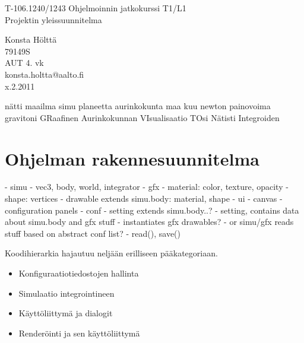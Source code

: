 \documentclass[a4paper,11pt]{article}
\begin{document}
\thispagestyle{empty}

\vspace*{5cm}

\begin{center}

{ \Huge T-106.1240/1243 Ohjelmoinnin jatkokurssi T1/L1 }
\\[1cm]
{ \huge Projektin yleissuunnitelma }
\end{center}

\vfill

\begin{flushright}

Konsta Hölttä\\
79149S\\
AUT 4. vk\\
konsta.holtta@aalto.fi\\
x.2.2011
\end{flushright}

\newcommand{\kuvaa}[4]{%
	\begin{figure}[h!]%
		\centering \texttt{[image: \#2]}%
		\caption{#3 \label{#4}}%
	\end{figure}%
}
\newcommand{\kuva}[2]{\kuvaa{0.6}{#1}{#2}{fig:#1}}

\newpage
nätti maailma simu planeetta aurinkokunta maa kuu newton painovoima
gravitoni
GRaafinen Aurinkokunnan VIsualisaatio TOsi Nätisti Integroiden

\section{Ohjelman rakennesuunnitelma}
- simu
	- vec3, body, world, integrator
- gfx
	- material: color, texture, opacity
	- shape: vertices
	- drawable extends simu.body: material, shape
- ui
	- canvas
	- configuration panels
- conf
	- setting extends simu.body..?
	- setting, contains data about simu.body and gfx stuff
	- instantiates gfx drawables?
	- or simu/gfx reads stuff based on abstract conf list?
	- read(), save()

Koodihierarkia hajautuu neljään erilliseen pääkategoriaan.

\begin{itemize}
	\item Konfiguraatiotiedostojen hallinta
	\item Simulaatio integrointineen
	\item Käyttöliittymä ja dialogit
	\item Renderöinti ja sen käyttöliittymä
\end{itemize}
\end{document}
